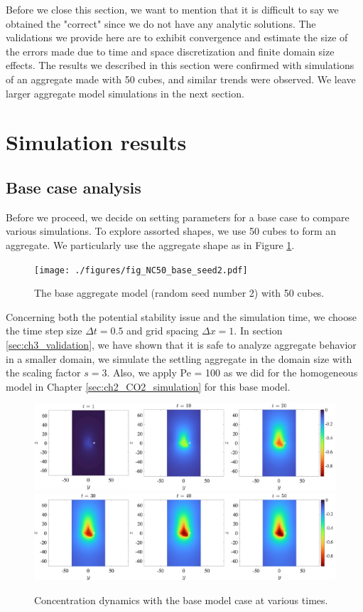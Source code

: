 \par
Before we close this section, we want to mention that it is difficult to say we obtained the "correct" since we do not have any analytic solutions. The validations we provide here are to exhibit convergence and estimate the size of the errors made due to time and space discretization and finite domain size effects.
The results we described in this section were confirmed with simulations of an aggregate made with 50 cubes, and similar trends were observed. We leave larger aggregate model simulations in the next section.
\section{Simulation results}
\label{sec:stratified_results}
\subsection{Base case analysis}
Before we proceed, we decide on setting parameters for a base case to compare various simulations. To explore assorted shapes, we use 50 cubes to form an aggregate. We particularly use the aggregate shape as in Figure \ref{fig_NC50_base_seed2}. 
\begin{figure}[ht]
	\begin{center}
		\texttt{[image: ./figures/fig\_NC50\_base\_seed2.pdf]}
	\caption{The base aggregate model (random seed number 2) with 50 cubes.}
	\label{fig_NC50_base_seed2}
\end{center}
\end{figure}
Concerning both the potential stability issue and the simulation time, we choose the time step size $\Delta t = 0.5$ and grid spacing $\Delta x =1$. In section \ref{sec:ch3_validation}, we have shown that it is safe to analyze aggregate behavior in a smaller domain, we simulate the settling aggregate in the domain size with the scaling factor $s = 3$.  Also, we apply Pe = 100 as we did for the homogeneous model in Chapter \ref{sec:ch2_CO2_simulation} for this base model.
\begin{figure}[ht]
	\begin{center}
		\includegraphics[scale=0.65]{./figures/fig_NC50_snaps_pt1.pdf}
		\includegraphics[scale=0.65]{./figures/fig_NC50_snaps_pt2.pdf}
	\caption{Concentration dynamics with the base model case at various times.}
	\label{fig_NC50_snaps_all}
\end{center}
\end{figure}
